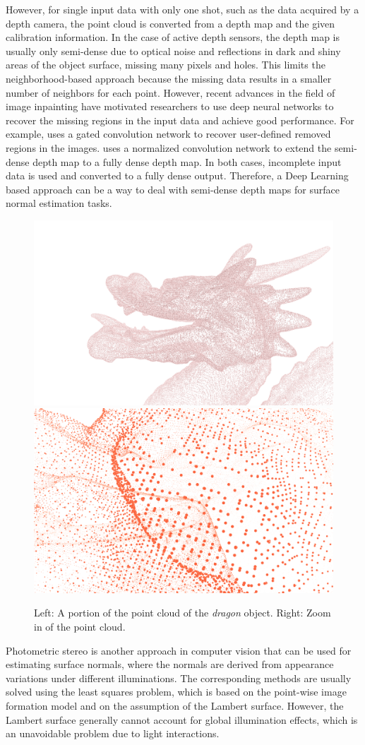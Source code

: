 However, for single input data with only one shot, such as the data acquired by a depth camera, the point cloud is converted from a depth map and the given calibration information. In the case of active depth sensors, the depth map is usually only semi-dense due to optical noise and reflections in dark and shiny areas of the object surface, missing many pixels and holes. This limits the neighborhood-based approach because the missing data results in a smaller number of neighbors for each point. However, recent advances in the field of image inpainting have motivated researchers to use deep neural networks to recover the missing regions in the input data and achieve good performance. For example, \cite{gconv} uses a gated convolution network to recover user-defined removed regions in the images. \cite{nconv} uses a normalized convolution network to extend the semi-dense depth map to a fully dense depth map. In both cases, incomplete input data is used and converted to a fully dense output. Therefore, a Deep Learning based approach can be a way to deal with semi-dense depth maps for surface normal estimation tasks.

\begin{figure}[h!]
	\centering
	\captionsetup{width=\linewidth}
	{\includegraphics[width=.49\textwidth]{./Figures/point-cloud.png}}
	{\includegraphics[width=.49\textwidth]{./Figures/point-cloud-zoom-in.png}}
	\decoRule
	\caption{Left: A portion of the point cloud of the \textit{dragon} object. Right: Zoom in of the point cloud.}
	\label{fig:point-cloud}
\end{figure}

Photometric stereo is another approach in computer vision that can be used for estimating surface normals, where the normals are derived from appearance variations under different illuminations. The corresponding methods are usually solved using the least squares problem, which is based on the point-wise image formation model \cite{SFS} and on the assumption of the Lambert surface. However, the Lambert surface generally cannot account for global illumination effects, which is an unavoidable problem due to light interactions.

